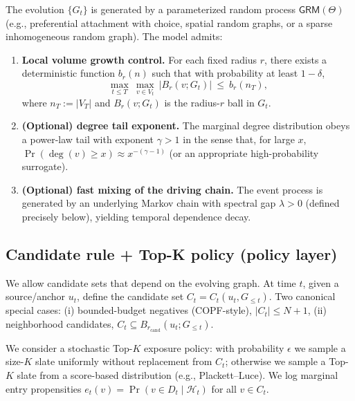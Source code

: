 \documentclass[12pt,a4paper]{article}
\begin{document}
\begin{assumption}
\label{ass:grm}
The evolution $\{G_t\}$ is generated by a parameterized random process $\mathsf{GRM}(\Theta)$
(e.g., preferential attachment with choice, spatial random graphs, or a sparse inhomogeneous random graph).
The model admits:
\begin{enumerate}
\item \textbf{Local volume growth control.} For each fixed radius $r$,
there exists a deterministic function $b_r(n)$ such that with probability at least $1-\delta$,
\[
\max_{t\le T}\ \max_{v\in V_t} \ |B_r(v;G_t)| \ \le\ b_r(n_T),
\]
where $n_T:=|V_T|$ and $B_r(v;G_t)$ is the radius-$r$ ball in $G_t$.
\item \textbf{(Optional) degree tail exponent.} The marginal degree distribution obeys a power-law tail
with exponent $\gamma>1$ in the sense that, for large $x$,
$\Pr(\deg(v)\ge x)\approx x^{-(\gamma-1)}$ (or an appropriate high-probability surrogate).
\item \textbf{(Optional) fast mixing of the driving chain.} The event process is generated by
an underlying Markov chain with spectral gap $\lambda>0$ (defined precisely below), yielding
temporal dependence decay.
\end{enumerate}
\end{assumption}



\subsection{Candidate rule + Top-K policy (policy layer)}
We allow candidate sets that depend on the evolving graph.
At time $t$, given a source/anchor $u_t$, define the candidate set $C_t=C_t(u_t,G_{\le t})$.
Two canonical special cases:
(i) bounded-budget negatives (COPF-style), $|C_t|\le N+1$,
(ii) neighborhood candidates, $C_t \subseteq B_{r_{\mathrm{cand}}}(u_t;G_{\le t})$.

We consider a stochastic Top-$K$ exposure policy:
with probability $\epsilon$ we sample a size-$K$ slate uniformly without replacement from $C_t$;
otherwise we sample a Top-$K$ slate from a score-based distribution (e.g., Plackett--Luce).
We log marginal entry propensities $e_t(v)=\Pr(v\in D_t\mid \mathcal{H}_t)$ for all $v\in C_t$.
\end{document}
